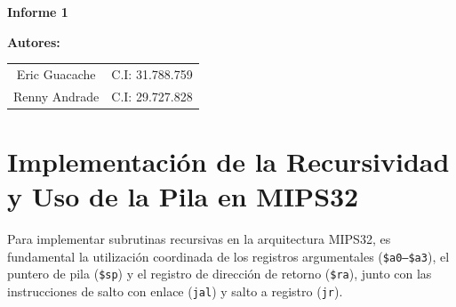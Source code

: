 \documentclass[12pt,a4paper]{article}
\begin{document}
\begin{titlepage}
    \centering
    \vspace*{4cm}
    
    {\Huge \bfseries Informe 1 \par}
    \vspace{2cm}
    
    {\Large \bfseries Autores: \par}
    \vspace{0.5cm}
    {\large
    \begin{tabular}{cl}
        Eric Guacache & C.I: 31.788.759 \\
        Renny Andrade & C.I: 29.727.828 \\
    \end{tabular}
    \par}
    
    \vfill
    {\large \thepage}
\end{titlepage}

\newpage
\pagestyle{fancy}
\setcounter{page}{2}

\tableofcontents
\newpage


\section{Implementación de la Recursividad y Uso de la Pila en MIPS32}

Para implementar subrutinas recursivas en la arquitectura MIPS32, es fundamental la utilización coordinada de los registros argumentales (\texttt{\$a0--\$a3}), el puntero de pila (\texttt{\$sp}) y el registro de dirección de retorno (\texttt{\$ra}), junto con las instrucciones de salto con enlace (\texttt{jal}) y salto a registro (\texttt{jr}).
\end{document}
